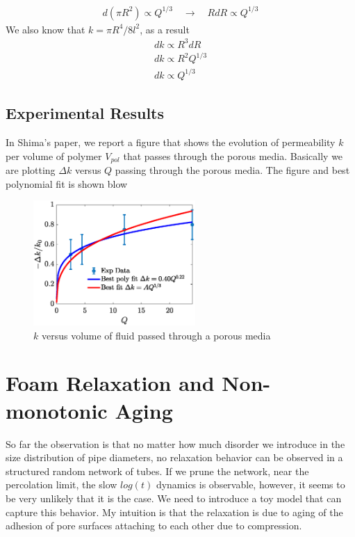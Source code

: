 %
\begin{align}
  d (\pi R^2) \propto Q^{1/3} \quad \to \quad R dR \propto Q^{1/3}
\end{align}
%
We also know that $k = \pi R^4/8l^2$, as a result
%
\begin{align}
  dk \propto R^{3} dR \\
  dk \propto R^2 Q^{1/3} \\
  dk \propto Q^{1/3}
\end{align}

\subsection*{Experimental Results}
%
In Shima's paper, we report a figure that shows the evolution of
permeability $k$ per volume of polymer $V_{pol}$ that passes through
the porous media. Basically we are plotting $\Delta k$ versus $Q$
passing through the porous media. The figure and best polynomial fit
is shown blow
%
%
\begin{figure}[H]
  \centering
  \includegraphics[width=0.55\textwidth]{./Figs/k-evolution.eps}
  \caption{$k$ versus volume of fluid passed through a porous media}
\end{figure}


\section{Foam Relaxation and Non-monotonic Aging}
%
So far the observation is that no matter how much disorder we
introduce in the size distribution of pipe diameters, no relaxation
behavior can be observed in a structured random network of tubes. If
we prune the network, near the percolation limit, the slow $log(t)$
dynamics is observable, however, it seems to be very unlikely that it
is the case. We need to introduce a toy model that can capture this
behavior. My intuition is that the relaxation is due to aging of the
adhesion of pore surfaces attaching to each other due to compression.
%


